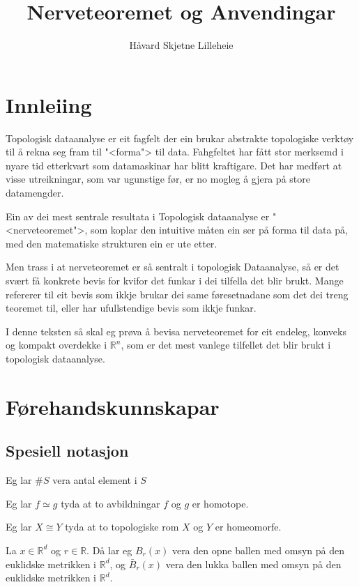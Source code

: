 \documentclass[a4paper, 12pt, norsk]{article}
\title{Nerveteoremet og Anvendingar}
\author{Håvard Skjetne Lilleheie}
\theoremstyle{plain}
\theoremstyle{definition}
\newcommand{\Rb}{\mathbb{R}}
\begin{document}
\maketitle

\tableofcontents

\newpage

\section{Innleiing}

Topologisk dataanalyse er eit fagfelt der ein brukar abstrakte topologiske verktøy til å rekna seg fram til "<forma"> til data. Fahgfeltet har fått stor merksemd i nyare tid etterkvart som datamaskinar har blitt kraftigare. Det har medført at visse utreikningar, som var ugunstige før, er no mogleg å gjera på store datamengder.

Ein av dei mest sentrale resultata i Topologisk dataanalyse er "<nerveteoremet">, som koplar den intuitive måten ein ser på forma til data på, med den matematiske strukturen ein er ute etter.

Men trass i at nerveteoremet er så sentralt i topologisk Dataanalyse, så er det svært få konkrete bevis for kvifor det funkar i dei tilfella det blir brukt. Mange refererer til eit bevis som ikkje brukar dei same føresetnadane som det dei treng teoremet til, eller har ufullstendige bevis som ikkje funkar.

I denne teksten så skal eg prøva å bevisa nerveteoremet for eit endeleg, konveks og kompakt overdekke i \( \Rb^n \), som er det mest vanlege tilfellet det blir brukt i topologisk dataanalyse.

\section{Førehandskunnskapar}

\subsection{Spesiell notasjon}
 
Eg lar \( \#S \) vera antal element i \( S \)

Eg lar \( f \simeq  g \) tyda at to avbildningar \( f \) og \( g \) er homotope.

Eg lar \( X \cong Y \) tyda at to topologiske rom \( X \) og \( Y \) er homeomorfe.

La \( x \in \Rb^d \) og \( r \in \Rb \). Då lar eg \( B_r(x) \) vera den opne ballen med omsyn på den euklidske metrikken i \( \Rb^d \), og \( \bar{B}_r(x) \) vera den lukka ballen med omsyn på den euklidske metrikken i \( \Rb^d \).
\end{document}
